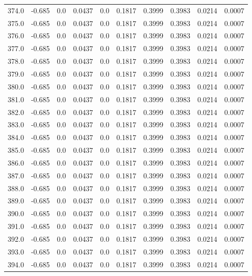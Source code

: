 \begin{longtable}{lrrrrrrrrr}
374.0 & -0.685 & 0.0 & 0.0437 & 0.0 & 0.1817 & 0.3999 & 0.3983 & 0.0214 & 0.0007 \\
375.0 & -0.685 & 0.0 & 0.0437 & 0.0 & 0.1817 & 0.3999 & 0.3983 & 0.0214 & 0.0007 \\
376.0 & -0.685 & 0.0 & 0.0437 & 0.0 & 0.1817 & 0.3999 & 0.3983 & 0.0214 & 0.0007 \\
377.0 & -0.685 & 0.0 & 0.0437 & 0.0 & 0.1817 & 0.3999 & 0.3983 & 0.0214 & 0.0007 \\
378.0 & -0.685 & 0.0 & 0.0437 & 0.0 & 0.1817 & 0.3999 & 0.3983 & 0.0214 & 0.0007 \\
379.0 & -0.685 & 0.0 & 0.0437 & 0.0 & 0.1817 & 0.3999 & 0.3983 & 0.0214 & 0.0007 \\
380.0 & -0.685 & 0.0 & 0.0437 & 0.0 & 0.1817 & 0.3999 & 0.3983 & 0.0214 & 0.0007 \\
381.0 & -0.685 & 0.0 & 0.0437 & 0.0 & 0.1817 & 0.3999 & 0.3983 & 0.0214 & 0.0007 \\
382.0 & -0.685 & 0.0 & 0.0437 & 0.0 & 0.1817 & 0.3999 & 0.3983 & 0.0214 & 0.0007 \\
383.0 & -0.685 & 0.0 & 0.0437 & 0.0 & 0.1817 & 0.3999 & 0.3983 & 0.0214 & 0.0007 \\
384.0 & -0.685 & 0.0 & 0.0437 & 0.0 & 0.1817 & 0.3999 & 0.3983 & 0.0214 & 0.0007 \\
385.0 & -0.685 & 0.0 & 0.0437 & 0.0 & 0.1817 & 0.3999 & 0.3983 & 0.0214 & 0.0007 \\
386.0 & -0.685 & 0.0 & 0.0437 & 0.0 & 0.1817 & 0.3999 & 0.3983 & 0.0214 & 0.0007 \\
387.0 & -0.685 & 0.0 & 0.0437 & 0.0 & 0.1817 & 0.3999 & 0.3983 & 0.0214 & 0.0007 \\
388.0 & -0.685 & 0.0 & 0.0437 & 0.0 & 0.1817 & 0.3999 & 0.3983 & 0.0214 & 0.0007 \\
389.0 & -0.685 & 0.0 & 0.0437 & 0.0 & 0.1817 & 0.3999 & 0.3983 & 0.0214 & 0.0007 \\
390.0 & -0.685 & 0.0 & 0.0437 & 0.0 & 0.1817 & 0.3999 & 0.3983 & 0.0214 & 0.0007 \\
391.0 & -0.685 & 0.0 & 0.0437 & 0.0 & 0.1817 & 0.3999 & 0.3983 & 0.0214 & 0.0007 \\
392.0 & -0.685 & 0.0 & 0.0437 & 0.0 & 0.1817 & 0.3999 & 0.3983 & 0.0214 & 0.0007 \\
393.0 & -0.685 & 0.0 & 0.0437 & 0.0 & 0.1817 & 0.3999 & 0.3983 & 0.0214 & 0.0007 \\
394.0 & -0.685 & 0.0 & 0.0437 & 0.0 & 0.1817 & 0.3999 & 0.3983 & 0.0214 & 0.0007 \\

\end{longtable}
